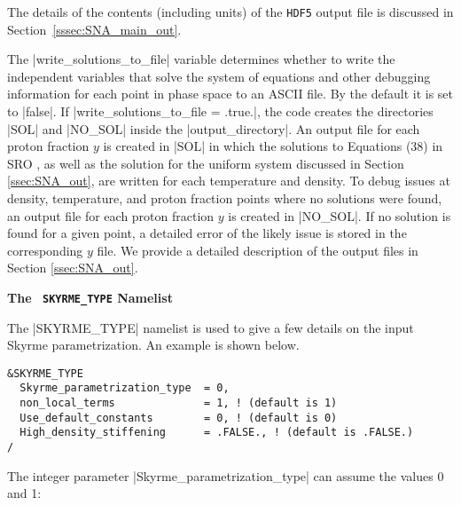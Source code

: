 \documentclass[letterpaper,11pt]{refart}
\begin{document}
The details of the contents (including units) of the \verb|HDF5| output file 
is discussed in Section~\ref{sssec:SNA_main_out}.

  
The
\verbprm|write_solutions_to_file| variable determines whether to write the independent
variables that solve the system of equations and other debugging
information for each point in phase space to an ASCII file. By the
default it is set to
\verbprm|false|. If \verbprm|write_solutions_to_file = .true.|, the
code creates the directories \verbfile|SOL| and \verbfile|NO_SOL|
inside the \verbfile|output_directory|.  An output file for each
proton fraction $y$ is created in
\verbfile|SOL| in which the solutions to Equations (38) in SRO \cite{schneider:17}, as well as the solution for
the uniform system discussed in Section \ref{ssec:SNA_out}, are
written for each temperature and density.  To debug issues at density,
temperature, and proton fraction points where no solutions were found,
an output file for each proton fraction $y$ is created in
\verbfile|NO_SOL|.  If no solution is found for a given point, a
detailed error of the likely issue is stored in the corresponding $y$
file.  We provide a detailed description of the output files in
Section \ref{ssec:SNA_out}.


\bigskip
\textbf{The \texttt{\color{cyan} SKYRME\_TYPE} Namelist}

The \verbnml|SKYRME_TYPE| namelist is used to give a few details on
the input Skyrme parametrization. An example is shown below.

{\color{cyan}
\begin{verbatim}
&SKYRME_TYPE
  Skyrme_parametrization_type  = 0,
  non_local_terms              = 1, ! (default is 1) 
  Use_default_constants        = 0, ! (default is 0) 
  High_density_stiffening      = .FALSE., ! (default is .FALSE.) 
/
\end{verbatim}}




The integer parameter \verbprm|Skyrme_parametrization_type| can assume
the values 0 and 1:
\end{document}

